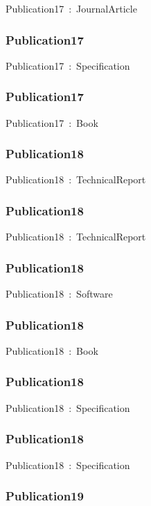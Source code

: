 \documentclass{article}
\begin{document}
Publication17~:~JournalArticle

\subsubsection*{Publication17}

Publication17~:~Specification

\subsubsection*{Publication17}

Publication17~:~Book

\subsubsection*{Publication18}

Publication18~:~TechnicalReport

\subsubsection*{Publication18}

Publication18~:~TechnicalReport

\subsubsection*{Publication18}

Publication18~:~Software

\subsubsection*{Publication18}

Publication18~:~Book

\subsubsection*{Publication18}

Publication18~:~Specification

\subsubsection*{Publication18}

Publication18~:~Specification

\subsubsection*{Publication19}
\end{document}
